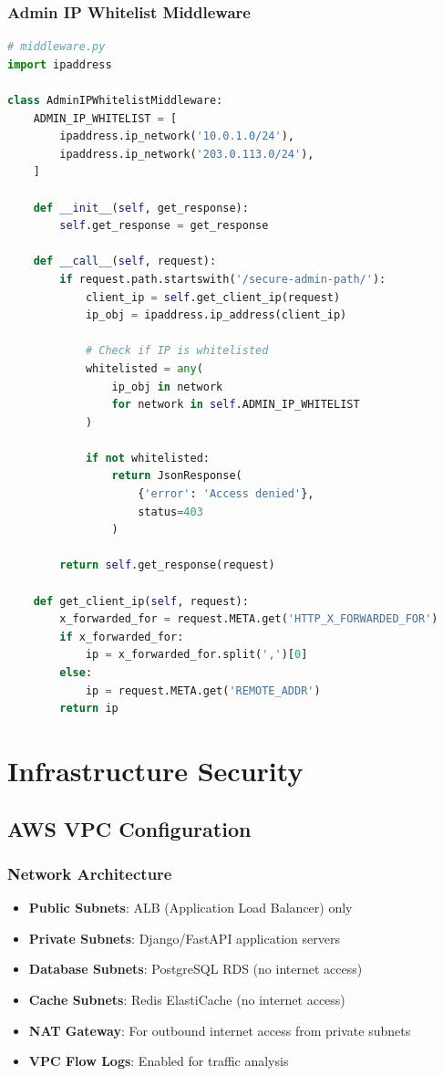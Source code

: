 \documentclass{report}
\begin{document}
\subsection{Admin IP Whitelist Middleware}
\begin{lstlisting}[language=Python]
# middleware.py
import ipaddress

class AdminIPWhitelistMiddleware:
    ADMIN_IP_WHITELIST = [
        ipaddress.ip_network('10.0.1.0/24'),
        ipaddress.ip_network('203.0.113.0/24'),
    ]
    
    def __init__(self, get_response):
        self.get_response = get_response
    
    def __call__(self, request):
        if request.path.startswith('/secure-admin-path/'):
            client_ip = self.get_client_ip(request)
            ip_obj = ipaddress.ip_address(client_ip)
            
            # Check if IP is whitelisted
            whitelisted = any(
                ip_obj in network 
                for network in self.ADMIN_IP_WHITELIST
            )
            
            if not whitelisted:
                return JsonResponse(
                    {'error': 'Access denied'},
                    status=403
                )
        
        return self.get_response(request)
    
    def get_client_ip(self, request):
        x_forwarded_for = request.META.get('HTTP_X_FORWARDED_FOR')
        if x_forwarded_for:
            ip = x_forwarded_for.split(',')[0]
        else:
            ip = request.META.get('REMOTE_ADDR')
        return ip
\end{lstlisting}


\chapter{Infrastructure Security}

\section{AWS VPC Configuration}

\subsection{Network Architecture}
\begin{itemize}
\item \textbf{Public Subnets}: ALB (Application Load Balancer) only
\item \textbf{Private Subnets}: Django/FastAPI application servers
\item \textbf{Database Subnets}: PostgreSQL RDS (no internet access)
\item \textbf{Cache Subnets}: Redis ElastiCache (no internet access)
\item \textbf{NAT Gateway}: For outbound internet access from private subnets
\item \textbf{VPC Flow Logs}: Enabled for traffic analysis
\end{itemize}
\end{document}
